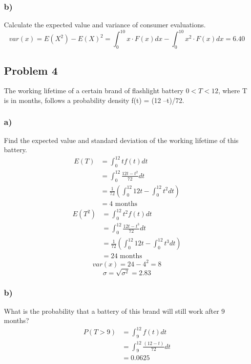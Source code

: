 \documentclass{article}
\begin{document}
\subsubsection*{b)}
Calculate the expected value and variance of consumer evaluations.
\begin{equation}
    var(x) = E(X^2) - E(X)^2 = \int_0^{10}x\cdot F(x)dx - \int_0^{10}x^2\cdot F(x)dx = \boxed{6.40}
\end{equation}
\newpage
\subsection*{Problem 4}
The working lifetime of a certain brand of flashlight battery $0 < T< 12$, where T is in months, follows a probability density f(t) = (12 –t)/72.
\subsubsection*{a)}
Find the expected value and standard deviation of the working lifetime of this battery.
\begin{align}
    E(T) &= \int_0^{12}tf(t)dt\\
    &= \int_0^{12}\frac{12t-t^2}{72}dt\\
    &= \frac{1}{72}\left(\int_0^{12}12t-\int_0^{12}t^2dt\right)\\
    &= \boxed{4\text{ months}}
\end{align}
\begin{align}
    E(T^2) &= \int_0^{12}t^2f(t)dt\\
    &= \int_0^{12}\frac{12t-t^3}{72}dt\\
    &= \frac{1}{72}\left(\int_0^{12}12t-\int_0^{12}t^3dt\right)\\
    &= \boxed{24\text{ months}}
\end{align}
\begin{equation}
    var(x) = 24 - 4^2 = \boxed{8}
\end{equation}
\begin{equation}
    \sigma = \sqrt{\sigma^2} = \boxed{2.83}
\end{equation}
\subsubsection*{b)}
What is the probability that a battery of this brand will still work after 9 months?
\begin{align}
    P(T > 9) &= \int_9^{12} f(t)dt\\
    &=\int_9^{12}\frac{(12-t)}{72}dt\\
    &= \boxed{0.0625}
\end{align}
\newpage
\end{document}
